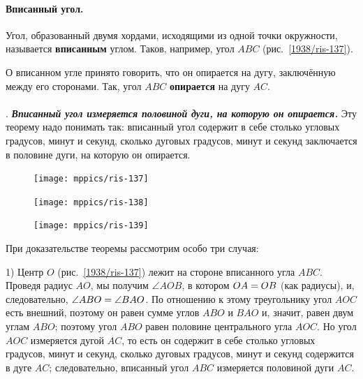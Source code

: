 \documentclass[twoside]{book}
\makeatletter
\newcommand{\rindex}[2][\imki@jobname]{%
  \index[#1]{\detokenize{#2}}%
}
\makeatother
\begin{document}
\paragraph{Вписанный угол.}\label{1938/123}
Угол, образованный двумя хордами, исходящими из одной точки окружности, называется \rindex{вписанный угол}\textbf{вписанным} углом.
Таков, например, угол $ABC$ (рис.~\ref{1938/ris-137}).

О вписанном угле принято говорить, что он опирается на дугу, заключённую между его сторонами.
Так, угол $ABC$ \rindex{опирается на дугу}\textbf{опирается} на дугу $AC$.

\paragraph{}\label{1938/124} 
.
\textbf{\emph{Вписанный угол измеряется половиной дуги, на которую он опирается.}}
Эту теорему надо понимать так:
вписанный угол содержит в себе столько угловых градусов, минут и секунд, сколько дуговых градусов, минут и секунд заключается в половине дуги, на которую он опирается.

\begin{figure}[h]
\begin{minipage}{.32\textwidth}
\centering
\texttt{[image: mppics/ris-137]}
\end{minipage}
\hfill
\begin{minipage}{.32\textwidth}
\centering
\texttt{[image: mppics/ris-138]}
\end{minipage}
\hfill
\begin{minipage}{.32\textwidth}
\centering
\texttt{[image: mppics/ris-139]}
\end{minipage}

\medskip

\begin{minipage}{.32\textwidth}
\centering
\caption{}\label{1938/ris-137}
\end{minipage}
\hfill
\begin{minipage}{.32\textwidth}
\centering
\caption{}\label{1938/ris-138}
\end{minipage}
\hfill
\begin{minipage}{.32\textwidth}
\centering
\caption{}\label{1938/ris-139}
\end{minipage}
\vskip-4mm
\end{figure}

При доказательстве теоремы рассмотрим особо три случая:

1) Центр $O$ (рис.~\ref{1938/ris-137}) лежит на стороне вписанного угла $ABC$.
Проведя радиус $AO$, мы получим $\angle AOB$, в котором $OA \z= OB$ (как радиусы), и, следовательно, $\angle ABO\z=\angle BAO$.
По отношению к этому треугольнику угол $AOC$ есть внешний, поэтому он равен сумме углов $ABO$ и $BAO$ и, значит, равен двум углам $ABO$;
поэтому угол $ABO$ равен половине центрального угла $AOC$.
Но угол $AOC$ измеряется дугой $AC$, то есть
он содержит в себе столько угловых градусов, минут и секунд, сколько дуговых градусов, минут и секунд содержится в дуге $AC$;
следовательно, вписанный угол $ABC$ измеряется половиной дуги $AC$.
\end{document}
